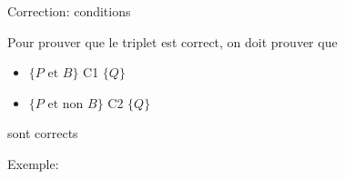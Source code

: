 \begin{frame}{Correction: conditions}

\begin{center}\footnotesize
{}
\end{center}

Pour prouver que le triplet est correct, on doit prouver que
\begin{itemize}
\item $\{P\mbox{ et }B\}$ C1 $\{Q\}$
\item $\{P\mbox{ et non }B\}$ C2 $\{Q\}$
\end{itemize}
sont corrects

\bigskip

Exemple:
\begin{center}\footnotesize
{}
\end{center}

\end{frame}

